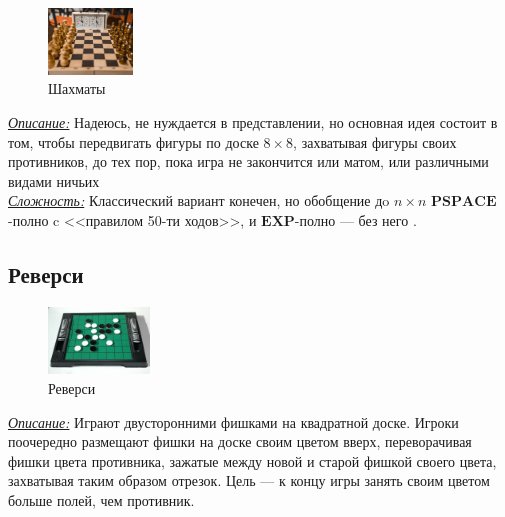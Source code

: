 \documentclass{article}
\begin{document}
\begin{figure}
    \centering
    \includegraphics[width=0.2\textwidth]{chess.jpg}
    \caption{Шахматы}
\end{figure}

\noindent\textit{\underline{Описание:}} Надеюсь, не нуждается в представлении, но основная идея состоит в том, чтобы передвигать фигуры по доске $8 \times 8$, захватывая фигуры своих противников, до тех пор, пока игра не закончится или матом, или различными видами ничьих \\

\noindent\textit{\underline{Сложность:}} Классический вариант конечен, но обобщение дo $n \times n$ $\mathbf{PSPACE}$-полно c <<правилом 50-ти ходов>>, и $\mathbf{EXP}$-полно --- без него \cite{chess}.
\newpage





\subsection*{Реверси}

\begin{figure}
    \centering
    \includegraphics[width=0.24\textwidth]{reversi.jpg}
    \caption{Реверси}
\end{figure}
\frenchspacing
\noindent \textit{\underline{Описание:} } Играют двусторонними фишками на квадратной доске. Игроки поочередно размещают фишки на доске своим цветом вверх, переворачивая фишки цвета противника, зажатые между новой и старой фишкой своего цвета, захватывая таким образом отрезок. Цель  --- к концу игры занять своим цветом больше полей, чем противник.
\\
\end{document}
